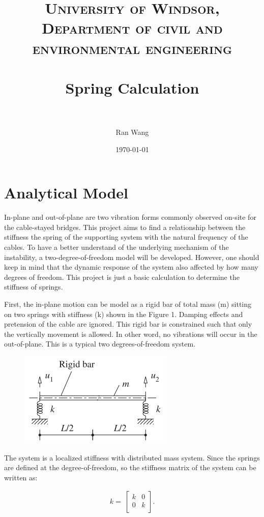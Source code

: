 \documentclass[paper=a4, fontsize=11pt]{scrartcl} %
\title{
\normalfont \normalsize
\textsc{University of Windsor, Department of civil and environmental engineering} \\ [25pt] %
\horrule{0.5pt} \\[0.4cm] %
\huge Spring Calculation \\ %
\horrule{2pt} \\[0.5cm] %
}
\author{Ran Wang} %
\date{\normalsize\today} %
\numberwithin{equation}{section} %
\numberwithin{figure}{section} %
\numberwithin{table}{section} %
\begin{document}
\maketitle %


\section{Analytical Model}

In-plane and out-of-plane are two vibration forms commonly observed
on-site for the cable-stayed bridges. This project aims to find a
relationship between the stiffness the spring of the supporting system
with the natural frequency of the cables. To have a better understand
of the underlying mechanism of the instability, a
two-degree-of-freedom model will be developed. However, one should
keep in mind that the dynamic response of the system also affected by
how many degrees of freedom. This project is just a basic calculation
to determine the stiffness of springs.

First, the in-plane motion can be model as a rigid bar of total mass (m)
sitting on two springs with stiffness (k) shown in the Figure 1. Damping
effects and pretension of the cable are ignored. This rigid bar is
constrained such that only the vertically movement is allowed. In
other word, no vibrations will occur in the out-of-plane. This is a
typical two degrees-of-freedom system.

\begin{figure}
  \centering
  \includegraphics[width=0.4\linewidth]{fig/ana-mode.png}
\end{figure}

The system is a localized stiffness with distributed mass system.
Since the springs are defined at the degree-of-freedom, so the
stiffness matrix of the system can be written as:

\begin{align}
  k=\ \left[\begin{matrix}k&0\\0&k\\\end{matrix}\right].
\end{align}
\end{document}
